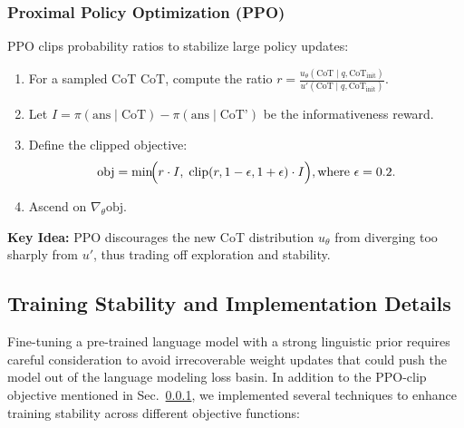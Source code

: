 \documentclass{article}
\begin{document}
\subsubsection{Proximal Policy Optimization (PPO)}
\label{subsubsec:ppo}
PPO clips probability ratios to stabilize large policy updates:
\begin{enumerate}
    \item For a sampled CoT $\text{CoT}$, compute the ratio $r = \frac{u_\theta(\text{CoT}\mid q,\text{CoT}_{\text{init}})}{u'(\text{CoT}\mid q,\text{CoT}_{\text{init}})}$.
    \item Let $I = \pi(\text{ans}\mid \text{CoT}) - \pi(\text{ans}\mid \text{CoT'})$ be the informativeness reward.
    \item Define the clipped objective:
    \[
    \text{obj} = \min\!\Bigl(r \cdot I, \;\text{clip}(r,1-\epsilon,1+\epsilon)\cdot I\Bigr), 
     \text{where } \epsilon=0.2.
    \]
    \item Ascend on $\nabla_\theta \text{obj}$.
\end{enumerate}
\textbf{Key Idea:} PPO discourages the new CoT distribution $u_\theta$ from diverging too sharply from $u'$, thus trading off exploration and stability.  


\subsection{Training Stability and Implementation Details}
\label{subsec:stability}
Fine-tuning a pre-trained language model with a strong linguistic prior requires careful consideration to avoid irrecoverable weight updates that could push the model out of the language modeling loss basin. In addition to the PPO-clip objective mentioned in Sec.~\ref{subsubsec:ppo}, we implemented several techniques to enhance training stability across different objective functions:
\end{document}

